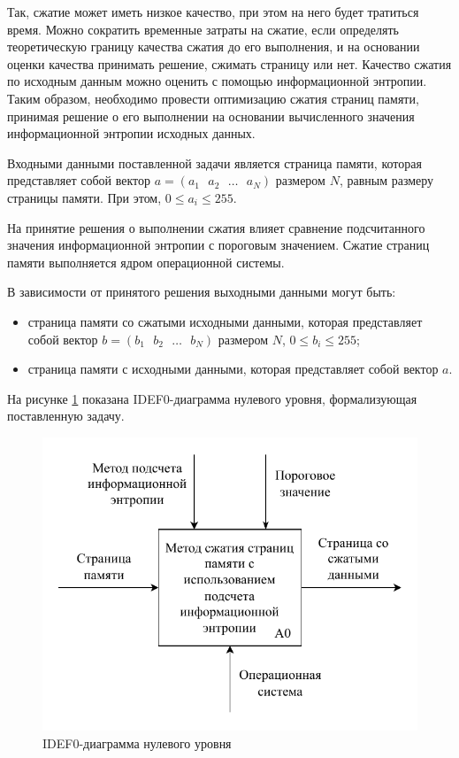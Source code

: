 Так, сжатие может иметь низкое качество, при этом на него будет тратиться время. Можно сократить временные затраты на сжатие, если определять теоретическую границу качества сжатия до его выполнения, и на основании оценки качества принимать решение, сжимать страницу или нет. Качество сжатия по исходным данным можно оценить с помощью информационной энтропии. Таким образом, необходимо провести оптимизацию сжатия страниц памяти, принимая решение о его выполнении на основании вычисленного значения информационной энтропии исходных данных.

Входными данными поставленной задачи является страница памяти, которая представляет собой вектор $a = (a_1\text{ }a_2\text{ }\dotso\text{ }a_N)$ размером $N$, равным размеру страницы памяти. При этом, $0 \leq a_i \leq 255$.

На принятие решения о выполнении сжатия влияет сравнение подсчитанного значения информационной энтропии с пороговым значением. Сжатие страниц памяти выполняется ядром операционной системы.

В зависимости от принятого решения выходными данными могут быть:
\begin{itemize}
	\item страница памяти со сжатыми исходными данными, которая представляет собой вектор $b = (b_1\text{ }b_2\text{ }\dotso\text{ }b_N)$ размером $N$, $0 \leq b_i \leq 255$;
    \item страница памяти с исходными данными, которая представляет собой вектор $a$.
\end{itemize}

На рисунке \ref{img:zero-level} показана IDEF0-диаграмма нулевого уровня, формализующая поставленную задачу.

\begin{figure}[H]
	\begin{center}
		\includegraphics[scale=0.8]{inc/img/zero-level.pdf}
	\end{center}
	\captionsetup{justification=centering}
	\caption{IDEF0-диаграмма нулевого уровня}
	\label{img:zero-level}
\end{figure}

